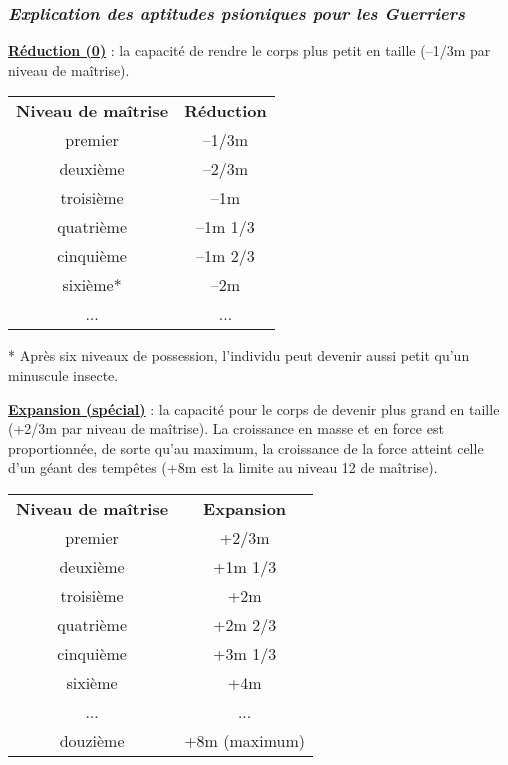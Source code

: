 \subsubsection*{\textit{Explication des aptitudes psioniques pour les Guerriers}}

\label{guerrier-reduction}\textbf{\uline{Réduction (0)}} : la capacité de rendre le corps plus petit en taille (--1/3m par niveau de maîtrise).

\bigskip

\begin{tabular}{cc}
\textbf{Niveau de maîtrise} & \textbf{Réduction} \\
premier     & --1/3m \\
deuxième    & --2/3m \\
troisième   & --1m \\
quatrième   & --1m 1/3 \\
cinquième   & --1m 2/3 \\
sixième*    & --2m \\
...         & ... \\
\end{tabular}

\medskip

* Après six niveaux de possession, l'individu peut devenir aussi petit qu'un minuscule insecte.

\bigskip

\label{guerrier-expansion}\textbf{\uline{Expansion (spécial)}} : la capacité pour le corps de devenir plus grand en taille (+2/3m par niveau de maîtrise). La croissance en masse et en force est proportionnée, de sorte qu'au maximum, la croissance de la force atteint celle d'un géant des tempêtes (+8m est la limite au niveau 12 de maîtrise).

\bigskip

\begin{tabular}{cc}
\textbf{Niveau de maîtrise} & \textbf{Expansion} \\
premier     & +2/3m \\
deuxième    & +1m 1/3 \\
troisième   & +2m \\
quatrième   & +2m 2/3 \\
cinquième   & +3m 1/3 \\
sixième     & +4m \\
...         & ... \\
douzième    & +8m (maximum) \\
\end{tabular}
\bigskip

